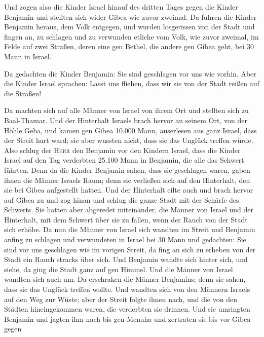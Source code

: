  Und zogen also die Kinder Israel hinauf des dritten
Tages gegen die Kinder Benjamin und stellten sich wider Gibea wie zuvor
zweimal.  Da fuhren die Kinder Benjamin heraus, dem Volk
entgegen, und wurden losgerissen von der Stadt und fingen an, zu
schlagen und zu verwunden etliche vom Volk, wie zuvor zweimal, im Felde
auf zwei Straßen, deren eine gen Bethel, die andere gen Gibea geht, bei
30 Mann in Israel.

 Da gedachten die Kinder Benjamin: Sie sind geschlagen
vor uns wie vorhin. Aber die Kinder Israel sprachen: Lasst uns fliehen,
dass wir sie von der Stadt reißen auf die Straßen!

 Da machten sich auf alle Männer von Israel von ihrem Ort
und stellten sich zu Baal-Thamar. Und der Hinterhalt Israels brach
hervor an seinem Ort, von der Höhle Geba,  und kamen gen
Gibea 10.000 Mann, auserlesen aus ganz Israel, dass der Streit hart
ward; sie aber wussten nicht, dass sie das Unglück treffen würde.
 Also schlug der \textsc{Herr} den Benjamin vor den
Kindern Israel, dass die Kinder Israel auf den Tag verderbten 25.100
Mann in Benjamin, die alle das Schwert führten.  Denn da
die Kinder Benjamin sahen, dass sie geschlagen waren, gaben ihnen die
Männer Israels Raum; denn sie verließen sich auf den Hinterhalt, den sie
bei Gibea aufgestellt hatten.  Und der Hinterhalt eilte
auch und brach hervor auf Gibea zu und zog hinan und schlug die ganze
Stadt mit der Schärfe des Schwerts.  Sie hatten aber
abgeredet miteinander, die Männer von Israel und der Hinterhalt, mit dem
Schwert über sie zu fallen, wenn der Rauch von der Stadt sich erhöbe.
 Da nun die Männer von Israel sich wandten im Streit und
Benjamin anfing zu schlagen und verwundeten in Israel bei 30 Mann und
gedachten: Sie sind vor uns geschlagen wie im vorigen Streit,
 da fing an sich zu erheben von der Stadt ein Rauch
stracks über sich. Und Benjamin wandte sich hinter sich, und siehe, da
ging die Stadt ganz auf gen Himmel.  Und die Männer von
Israel wandten sich auch um. Da erschraken die Männer Benjamins; denn
sie sahen, dass sie das Unglück treffen wollte.  Und
wandten sich von den Männern Israels auf den Weg zur Wüste; aber der
Streit folgte ihnen nach, und die von den Städten hineingekommen waren,
die verderbten sie drinnen.  Und sie umringten Benjamin
und jagten ihm nach bis gen Menuha und zertraten sie bis vor Gibea gegen
